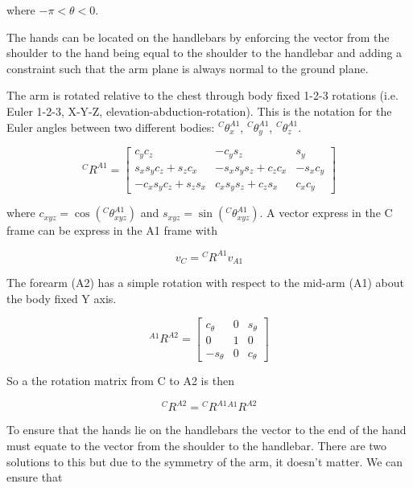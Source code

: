 \documentclass[10pt]{article}
\begin{document}
where \(-\pi<\theta<0\).

The hands can be located on the handlebars by enforcing the vector from the
shoulder to the hand being equal to the shoulder to the handlebar and adding
a constraint such that the arm plane is always normal to the ground plane.

The arm is rotated relative to the chest through body fixed 1-2-3 rotations
(i.e. Euler 1-2-3, X-Y-Z, elevation-abduction-rotation). This is the notation
for the Euler angles between two different bodies: \({}^C\theta^{A1}_x\),
\({}^C\theta^{A1}_y\), \({}^C\theta^{A1}_z\).

\begin{equation}
	{}^CR^{A1} =
	\begin{bmatrix}
		c_yc_z & -c_ys_z & s_y\\
		s_xs_yc_z+s_zc_x & -s_xs_ys_z+c_zc_x & -s_xc_y\\
		-c_xs_yc_z+s_zs_x & c_xs_ys_z+c_zs_x & c_xc_y
	\end{bmatrix}
\end{equation}

where \(c_{xyz}=\operatorname{cos}\left({}^C\theta^{A1}_{xyz}\right)\) and
\(s_{xyz}=\operatorname{sin}\left({}^C\theta^{A1}_{xyz}\right)\). A vector express in the C
frame can be express in the A1 frame with

\begin{equation}
	v_C={}^CR^{A1} v_{A1}
\end{equation}

The forearm (A2) has a simple rotation with respect to the mid-arm (A1) about
the body fixed Y axis.

\begin{equation}
  {}^{A1}R^{A2} =
  \begin{bmatrix}
    c_\theta & 0 & s_\theta\\
    0 & 1 & 0\\
    -s_\theta & 0 & c_\theta
  \end{bmatrix}
\end{equation}

So a the rotation matrix from C to A2 is then

\begin{equation}
	{}^CR^{A2} = {}^CR^{A1}{}^{A1}R^{A2}
\end{equation}

To ensure that the hands lie on the handlebars the vector to the end of the
hand must equate to the vector from the shoulder to the handlebar. There are
two solutions to this but due to the symmetry of the arm, it doesn't matter.
We can ensure that
\end{document}
